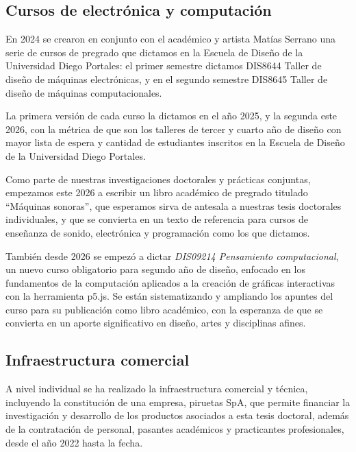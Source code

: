 \documentclass[../candidatura.tex]{subfiles}
\begin{document}
\subsection{Cursos de electrónica y computación}

En 2024 se crearon en conjunto con el académico y artista Matías Serrano una serie de cursos de pregrado que dictamos en la Escuela de Diseño de la Universidad Diego Portales: el primer semestre dictamos DIS8644 Taller de diseño de máquinas electrónicas, y en el segundo semestre DIS8645 Taller de diseño de máquinas computacionales.

La primera versión de cada curso la dictamos en el año 2025, y la segunda este 2026, con la métrica de que son los talleres de tercer y cuarto año de diseño con mayor lista de espera y cantidad de estudiantes inscritos en la Escuela de Diseño de la Universidad Diego Portales.

Como parte de nuestras investigaciones doctorales y prácticas conjuntas, empezamos este 2026 a escribir un libro académico de pregrado titulado ``Máquinas sonoras'', que esperamos sirva de antesala a nuestras tesis doctorales individuales, y que se convierta en un texto de referencia para cursos de enseñanza de sonido, electrónica y programación como los que dictamos.

También desde 2026 se empezó a dictar \textit{DIS09214 Pensamiento computacional}, un nuevo curso obligatorio para segundo año de diseño, enfocado en los fundamentos de la computación aplicados a la creación de gráficas interactivas con la herramienta p5.js. Se están sistematizando y ampliando los apuntes del curso para su publicación como libro académico, con la esperanza de que se convierta en un aporte significativo en diseño, artes y disciplinas afines.

\subsection{Infraestructura comercial}

A nivel individual se ha realizado la infraestructura comercial y técnica, incluyendo la constitución de una empresa, piruetas SpA, que permite financiar la investigación y desarrollo de los productos asociados a esta tesis doctoral, además de la contratación de personal, pasantes académicos y practicantes profesionales, desde el año 2022 hasta la fecha.
\end{document}
